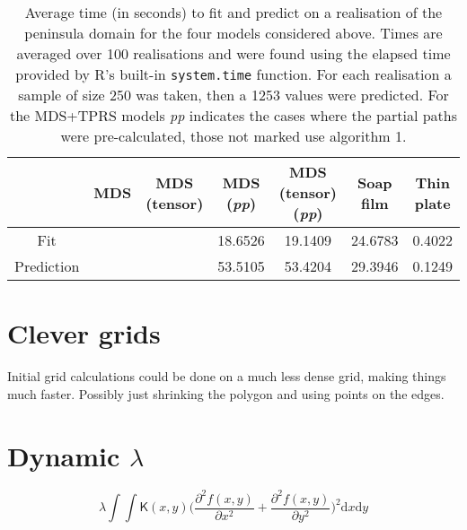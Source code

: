 \documentclass[a4paper,10pt]{article}
\begin{document}
\begin{table}[ht]
\centering
\begin{tabular}{c || c c c c c c}
 & MDS & MDS (tensor) & MDS (\textit{pp})& MDS (tensor) (\textit{pp})& Soap film & Thin plate\\ 
\hline
Fit & & & 18.6526 & 19.1409 & 24.6783 & 0.4022\\ 
Prediction & & & 53.5105 & 53.4204 & 29.3946 & 0.1249\\
\end{tabular}
\label{wt2time}
\caption{Average time (in seconds) to fit and predict on a realisation of the peninsula domain for the four models considered above. Times are averaged over 100 realisations and were found using the elapsed time provided by \textsf{R}'s built-in \texttt{system.time} function. For each realisation a sample of size 250 was taken, then a 1253 values were predicted. For the MDS+TPRS models \textit{pp} indicates the cases where the partial paths were pre-calculated, those not marked use algorithm 1.}
\end{table}











\section{Clever grids}

Initial grid calculations could be done on a much less dense grid, making things much faster. Possibly just shrinking the polygon and using points on the edges.



\section{Dynamic $\lambda$}


\begin{equation}
\lambda \int\int \mathsf{K}(x,y) \Big(\frac{\partial^2 f(x,y)}{\partial x^2} + \frac{\partial^2 f(x,y)}{\partial y^2}\Big)^2 \text{d}x\text{d}y
\end{equation}
\end{document}
